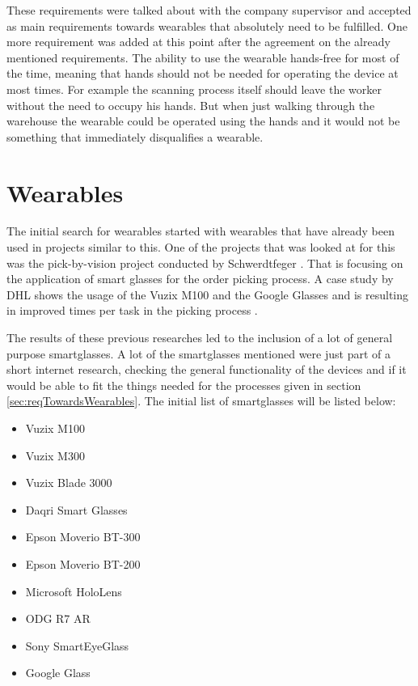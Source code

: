 These requirements were talked about with the company supervisor and accepted as main requirements towards wearables that absolutely need to be fulfilled. One more requirement was added at this point after the agreement on the already mentioned requirements. The ability to use the wearable hands-free for most of the time, meaning that hands should not be needed for operating the device at most times. For example the scanning process itself should leave the worker without the need to occupy his hands. But when just walking through the warehouse the wearable could be operated using the hands and it would not be something that immediately disqualifies a wearable.

\section{Wearables}
The initial search for wearables started with wearables that have already been used in projects similar to this. One of the projects that was looked at for this was the pick-by-vision project conducted by Schwerdtfeger \citep{phdthesis:pickByVision}. That is focusing on the application of smart glasses for the order picking process. A case study by DHL shows the usage of the Vuzix M100 and the Google Glasses and is resulting in improved times per task in the picking process  \citep{caseStudy:dhlWearables}. 

The results of these previous researches led to the inclusion of a lot of general purpose smartglasses. A lot of the smartglasses mentioned were just part of a short internet research, checking the general functionality of the devices and if it would be able to fit the things needed for the processes given in section \ref{sec:reqTowardsWearables}. The initial list of smartglasses will be listed below:

\begin{itemize}
	\item Vuzix M100
	\item Vuzix M300
	\item Vuzix Blade 3000
	\item Daqri Smart Glasses
	\item Epson Moverio BT-300
	\item Epson Moverio BT-200
	\item Microsoft HoloLens
	\item ODG R7 AR
	\item Sony SmartEyeGlass
	\item Google Glass
\end{itemize}

